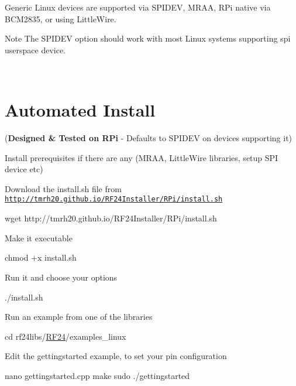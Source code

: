 Generic Linux devices are supported via S\+P\+I\+D\+EV, M\+R\+AA, R\+Pi native via B\+C\+M2835, or using Little\+Wire.

\begin{DoxyNote}{Note}
The S\+P\+I\+D\+EV option should work with most Linux systems supporting spi userspace device. ~\newline

\end{DoxyNote}
~\newline
 \hypertarget{Linux_AutoInstall}{}\section{Automated Install}\label{Linux_AutoInstall}
({\bfseries Designed \& Tested on R\+Pi} -\/ Defaults to S\+P\+I\+D\+EV on devices supporting it)


\begin{DoxyEnumerate}
\item Install prerequisites if there are any (M\+R\+AA, Little\+Wire libraries, setup S\+PI device etc)
\item Download the install.\+sh file from \href{http://tmrh20.github.io/RF24Installer/RPi/install.sh}{\tt http\+://tmrh20.\+github.\+io/\+R\+F24\+Installer/\+R\+Pi/install.\+sh} 
\begin{DoxyCode}
wget http:\textcolor{comment}{//tmrh20.github.io/RF24Installer/RPi/install.sh }
\end{DoxyCode}

\item Make it executable 
\begin{DoxyCode}
chmod +x install.sh 
\end{DoxyCode}

\item Run it and choose your options 
\begin{DoxyCode}
./install.sh 
\end{DoxyCode}

\item Run an example from one of the libraries 
\begin{DoxyCode}
cd rf24libs/\hyperlink{classRF24}{RF24}/examples\_linux  
\end{DoxyCode}
 Edit the gettingstarted example, to set your pin configuration 
\begin{DoxyCode}
nano gettingstarted.cpp
make  
sudo ./gettingstarted  
\end{DoxyCode}

\end{DoxyEnumerate}

